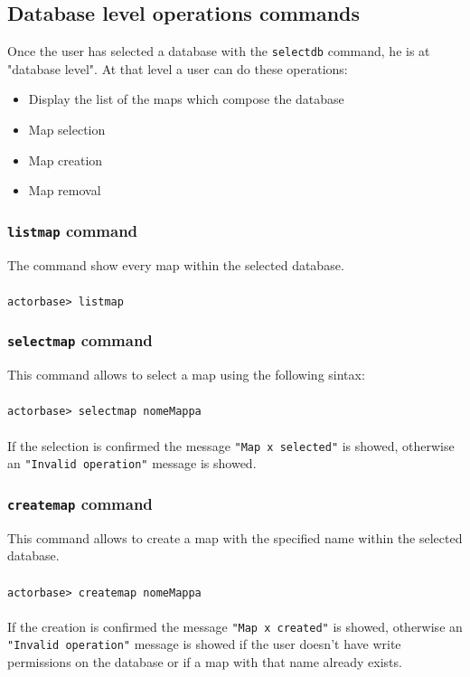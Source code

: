 \documentclass[a4paper]{article}
\begin{document}
	\subsection{Database level operations commands}
	Once the user has selected a database with the \texttt{selectdb} command, he is at "database level". At that level a user can do these operations:
	\begin{itemize}
		\item Display the list of the maps which compose the database
		\item Map selection
		\item Map creation
		\item Map removal
	\end{itemize}

	\subsubsection{\texttt{listmap} command}
	The command show every map within the selected database.
	\\ \\
	\texttt{actorbase>	listmap}

	\subsubsection{\texttt{selectmap} command}
	This command allows to select a map using the following sintax:
	\\ \\
	\texttt{actorbase>	selectmap nomeMappa}
	\\ \\
	If the selection is confirmed the message \texttt{"Map x selected"} is showed, otherwise an \texttt{"Invalid operation"} message is showed.

	\subsubsection{\texttt{createmap} command}
	This command allows to create a map with the specified name within the selected database.
	\\ \\
	\texttt{actorbase>	createmap nomeMappa}
	\\ \\
	If the creation is confirmed the message \texttt{"Map x created"} is showed, otherwise an \texttt{"Invalid operation"} message is showed if the user doesn't have write permissions on the database or if a map with that name already exists.
	
\end{document}
